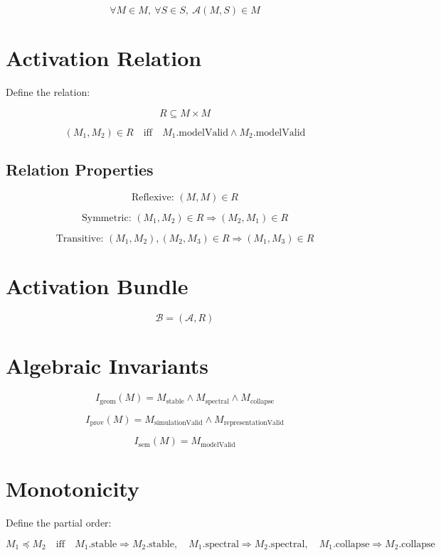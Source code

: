 \documentclass[11pt]{article}
\begin{document}
\[
\forall M \in M,\ \forall S \in S,\ \mathcal{A}(M, S) \in M
\]

\section*{Activation Relation}

Define the relation:

\[
R \subseteq M \times M
\]

\[
(M_1, M_2) \in R
\quad \text{iff} \quad
M_1.\text{modelValid} \land M_2.\text{modelValid}
\]

\subsection*{Relation Properties}

\[
\text{Reflexive: } (M, M) \in R
\]

\[
\text{Symmetric: } (M_1, M_2) \in R \Rightarrow (M_2, M_1) \in R
\]

\[
\text{Transitive: } (M_1, M_2),(M_2, M_3) \in R \Rightarrow (M_1, M_3) \in R
\]

\section*{Activation Bundle}

\[
\mathcal{B} = (\mathcal{A}, R)
\]

\section*{Algebraic Invariants}

\[
I_{\text{geom}}(M) =
  M_{\text{stable}} \land M_{\text{spectral}} \land M_{\text{collapse}}
\]

\[
I_{\text{prov}}(M) =
  M_{\text{simulationValid}} \land M_{\text{representationValid}}
\]

\[
I_{\text{sem}}(M) =
  M_{\text{modelValid}}
\]

\section*{Monotonicity}

Define the partial order:

\[
M_1 \preceq M_2
\quad \text{iff} \quad
M_1.\text{stable} \Rightarrow M_2.\text{stable},
\quad
M_1.\text{spectral} \Rightarrow M_2.\text{spectral},
\quad
M_1.\text{collapse} \Rightarrow M_2.\text{collapse}
\]
\end{document}
